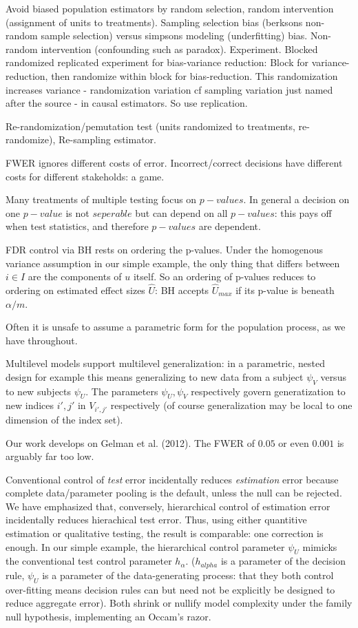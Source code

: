\documentclass{article}
\begin{document}
Avoid biased population estimators by random selection, random intervention (assignment of units to treatments).
Sampling selection bias (berksons non-random sample selection) versus simpsons modeling (underfitting) bias.
Non-random intervention (confounding such as paradox). Experiment. 
Blocked randomized replicated experiment for bias-variance reduction: Block for variance-reduction, then randomize within block for bias-reduction. This randomization increases variance - randomization variation cf sampling variation just named after the source - in causal estimators. So use replication.

Re-randomization/pemutation test (units randomized to treatments, re-randomize), Re-sampling estimator. 

FWER ignores different costs of error.
Incorrect/correct decisions have different costs for different stakeholds: a game. 

Many treatments of multiple testing focus on $p-values$. In general a decision on one $p-value$ is not $seperable$ but can depend on all $p-values$: this pays off when test statistics, and therefore $p-values$ are dependent.

FDR control via BH rests on ordering the p-values. Under the homogenous variance assumption in our simple example, the only thing that differs between $i \in I$ are the components of $u$ itself. So an ordering of p-values reduces to ordering on estimated effect sizes $\hat{U}$: BH accepts $\hat{U}_{max}$ if its p-value is beneath $\alpha/m$.

Often it is unsafe to assume a parametric form for the population process, as we have throughout.


Multilevel models support multilevel generalization: in a parametric, nested design for example this means generalizing to new data from a subject $\psi_V$ versus to new subjects $\psi_U$. The parameters $\psi_U,\psi_V$ respectively govern generatization to new indices $i',j'$ in $V_{i',j'}$ respectively (of course generalization may be local to one dimension of the index set).

Our work develops on Gelman et al. (2012). The FWER of $0.05$ or even $0.001$ is arguably far too low.

Conventional control of \textit{test} error incidentally reduces \textit{estimation} error because complete data/parameter pooling is the default, unless the null can be rejected. We have emphasized that, conversely, hierarchical control of estimation error incidentally reduces hierachical test error. Thus, using either quantitive estimation or qualitative testing, the result is comparable: one correction is enough. In our simple example, the hierarchical control parameter $\psi_U$ mimicks the conventional test control parameter $h_{\alpha}$. ($h_{alpha}$ is a parameter of the decision rule, $\psi_U$ is a parameter of the data-generating process: that they both control over-fitting means decision rules can but need not be explicitly be designed to reduce aggregate error).  Both shrink or nullify model complexity under the family null hypothesis, implementing an Occam's razor. 
\end{document}
